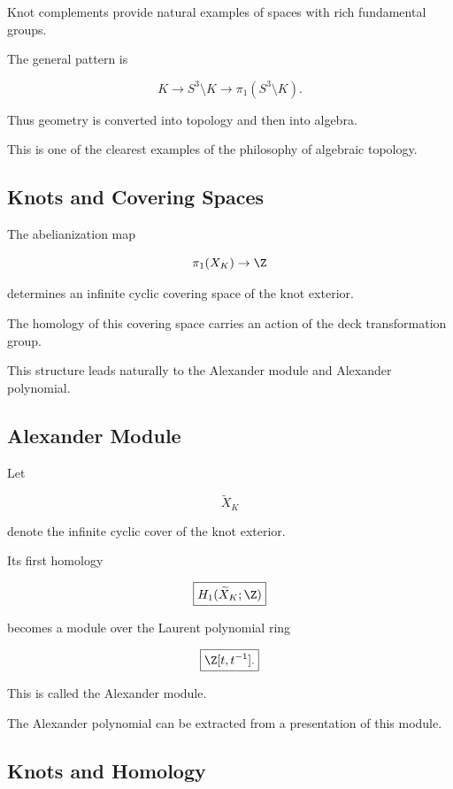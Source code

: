 Knot complements provide natural examples of spaces with rich fundamental
groups.

The general pattern is

\[
\boxed{
K
\longrightarrow
S^3\setminus K
\longrightarrow
\pi_1(S^3\setminus K).
}
\]

Thus geometry is converted into topology and then into algebra.

This is one of the clearest examples of the philosophy of algebraic
topology.

\subsection{Knots and Covering Spaces}
\label{subsec:knots-covering-spaces}

The abelianization map

\[
\pi_1(X_K)\to\Z
\]

determines an infinite cyclic covering space of the knot exterior.

The homology of this covering space carries an action of the deck
transformation group.

This structure leads naturally to the Alexander module and Alexander
polynomial.

\subsection{Alexander Module}
\label{subsec:alexander-module}

Let

\[
\widetilde{X}_K
\]

denote the infinite cyclic cover of the knot exterior.

Its first homology

\[
\boxed{
H_1(\widetilde{X}_K;\Z)
}
\]

becomes a module over the Laurent polynomial ring

\[
\boxed{
\Z[t,t^{-1}].
}
\]

This is called the Alexander module.

The Alexander polynomial can be extracted from a presentation of this
module.

\subsection{Knots and Homology}
\label{subsec:knots-homology}

